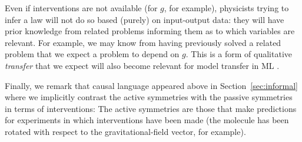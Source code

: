 \documentclass[accepted]{article}
\newcommand{\sectionname}{Section}
\newcommand{\secref}[1]{\sectionname~\ref{#1}}
\begin{document}
Even if interventions are not available (for $g$, for example), physicists trying to infer a law will not do so based (purely) on input-output data: they will have prior knowledge from related problems informing them as to which variables are relevant. For example, we may know from having previously solved a related problem that we expect a problem to depend on $g$.
This is a form of qualitative \emph{transfer} that we expect will also become relevant for model transfer in ML \citep{RojSchTurPet18}.

Finally, we remark that causal language appeared above in \secref{sec:informal} where we implicitly contrast the active symmetries with the passive symmetries in terms of interventions:
The active symmetries are those that make predictions for experiments in which interventions have been made (the molecule has been rotated with respect to the gravitational-field vector, for example).
\end{document}
